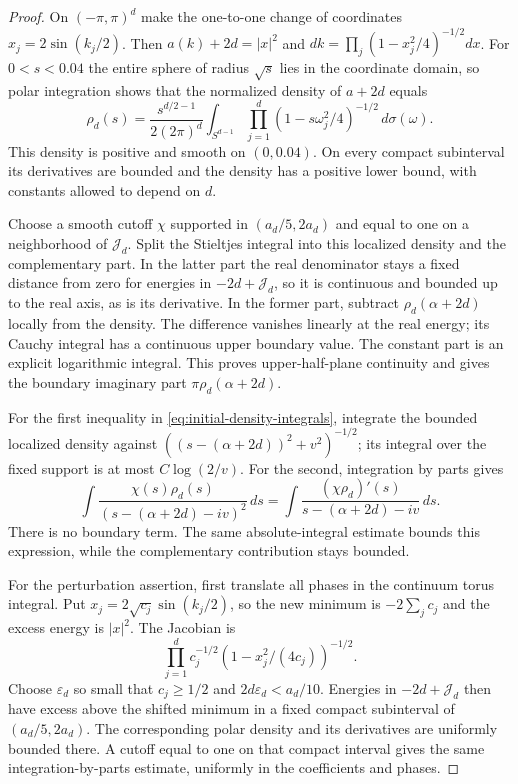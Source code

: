\begin{proof}
On $(-\pi,\pi)^d$ make the one-to-one change of coordinates
$x_j=2\sin(k_j/2)$. Then $a(k)+2d=|x|^2$ and
$dk=\prod_j(1-x_j^2/4)^{-1/2}dx$. For $0<s<0.04$ the entire
sphere of radius $\sqrt s$ lies in the coordinate domain, so polar
integration shows that the normalized density of $a+2d$ equals
\begin{equation}\label{eq:initial-density-formula}
 \rho_d(s)=\frac{s^{d/2-1}}{2(2\pi)^d}
   \int_{S^{d-1}}\prod_{j=1}^d
       (1-s\omega_j^2/4)^{-1/2}\,d\sigma(\omega).
\end{equation}
This density is positive and smooth on $(0,0.04)$. On every compact
subinterval its derivatives are bounded and the density has a positive
lower bound, with constants allowed to depend on $d$.

Choose a smooth cutoff $\chi$ supported in $(a_d/5,2a_d)$ and equal
to one on a neighborhood of $\mathcal J_d$. Split the Stieltjes integral into
this localized density and the complementary part. In the latter
part the real denominator stays a fixed distance from zero for
energies in $-2d+\mathcal J_d$, so it is continuous and bounded up to the real
axis, as is its derivative. In the former part, subtract
$\rho_d(\alpha+2d)$ locally from the density. The difference vanishes
linearly at the real energy; its Cauchy integral has a continuous
upper boundary value. The constant part is an explicit logarithmic
integral. This proves upper-half-plane continuity and gives the
boundary imaginary part $\pi\rho_d(\alpha+2d)$.

For the first inequality in \eqref{eq:initial-density-integrals},
integrate the bounded localized density against
$((s-(\alpha+2d))^2+v^2)^{-1/2}$; its integral over the fixed support
is at most $C\log(2/v)$. For the second, integration by parts gives
\[
 \int\frac{\chi(s)\rho_d(s)}{(s-(\alpha+2d)-iv)^2}\,ds
 =\int\frac{(\chi\rho_d)'(s)}{s-(\alpha+2d)-iv}\,ds.
\]
There is no boundary term. The same absolute-integral estimate bounds
this expression, while the complementary contribution stays bounded.

For the perturbation assertion, first translate all phases in the
continuum torus integral. Put
$x_j=2\sqrt{c_j}\sin(k_j/2)$, so the new minimum is
$-2\sum_jc_j$ and the excess energy is $|x|^2$. The Jacobian is
\[
 \prod_{j=1}^d c_j^{-1/2}
            (1-x_j^2/(4c_j))^{-1/2}.
\]
Choose $\varepsilon_d$ so small that $c_j\ge1/2$ and
$2d\varepsilon_d<a_d/10$. Energies in $-2d+\mathcal J_d$ then have excess
above the shifted minimum in a fixed compact subinterval of
$(a_d/5,2a_d)$. The corresponding polar density and its derivatives
are uniformly bounded there. A cutoff equal to one on that compact
interval gives the same integration-by-parts estimate, uniformly in
the coefficients and phases.
\end{proof}

